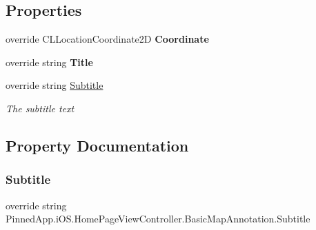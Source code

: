 \subsection*{Properties}
\begin{DoxyCompactItemize}
\item 
\mbox{\label{class_pinned_app_1_1i_o_s_1_1_home_page_view_controller_1_1_basic_map_annotation_a2993a72ac98d698b85841b2b36c0f13b}} 
override C\+L\+Location\+Coordinate2D {\bfseries Coordinate}
\item 
\mbox{\label{class_pinned_app_1_1i_o_s_1_1_home_page_view_controller_1_1_basic_map_annotation_ab9b454f173a3003e9ddcae1ab9aa0d03}} 
override string {\bfseries Title}
\item 
override string \hyperlink{class_pinned_app_1_1i_o_s_1_1_home_page_view_controller_1_1_basic_map_annotation_a37ea1d643752cb591fdfd715a2f8955a}{Subtitle}
\begin{DoxyCompactList}\small\item\em The subtitle text \end{DoxyCompactList}\end{DoxyCompactItemize}


\subsection{Property Documentation}
\mbox{\label{class_pinned_app_1_1i_o_s_1_1_home_page_view_controller_1_1_basic_map_annotation_a37ea1d643752cb591fdfd715a2f8955a}} 
\subsubsection{\texorpdfstring{Subtitle}{Subtitle}}
{\footnotesize\ttfamily override string Pinned\+App.\+i\+O\+S.\+Home\+Page\+View\+Controller.\+Basic\+Map\+Annotation.\+Subtitle\hspace{0.3cm}{\ttfamily [get]}}



